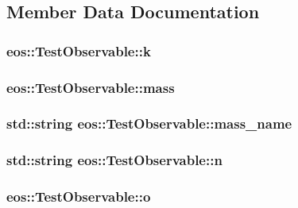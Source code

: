 \subsection{Member Data Documentation}
\hypertarget{structeos_1_1TestObservable_a58ef1eee27197c2bce21b2e576411a74}{
\subsubsection[{k}]{ {\bf eos::TestObservable::k}}}
\label{structeos_1_1TestObservable_a58ef1eee27197c2bce21b2e576411a74}
\hypertarget{structeos_1_1TestObservable_a131b40b285edbecfd177becbbf66b601}{
\subsubsection[{mass}]{ {\bf eos::TestObservable::mass}}}
\label{structeos_1_1TestObservable_a131b40b285edbecfd177becbbf66b601}
\hypertarget{structeos_1_1TestObservable_afa242c890fb7299876f30e8d01e218fc}{
\subsubsection[{mass\_\-name}]{\setlength{\rightskip}{0pt plus 5cm}std::string {\bf eos::TestObservable::mass\_\-name}}}
\label{structeos_1_1TestObservable_afa242c890fb7299876f30e8d01e218fc}
\hypertarget{structeos_1_1TestObservable_aad5736b5692f43ccae60087154fd2132}{
\subsubsection[{n}]{\setlength{\rightskip}{0pt plus 5cm}std::string {\bf eos::TestObservable::n}}}
\label{structeos_1_1TestObservable_aad5736b5692f43ccae60087154fd2132}
\hypertarget{structeos_1_1TestObservable_af9d523ad792f2ce3afa336f09d9226a6}{
\subsubsection[{o}]{ {\bf eos::TestObservable::o}}}
